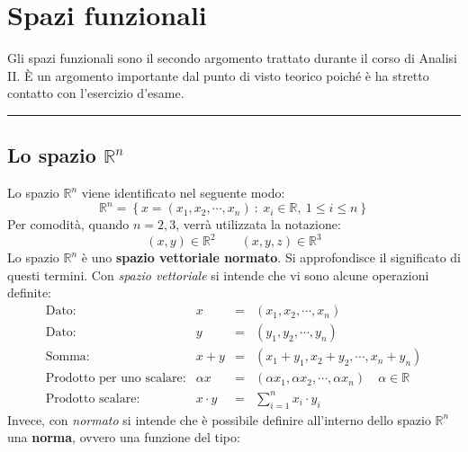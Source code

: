 \documentclass[a4paper]{article}
\newcommand{\longline}{\noindent\rule{\textwidth}{0.4pt}}
\begin{document}
	\section{Spazi funzionali}\label{section: spazi funzionali}

	Gli spazi funzionali sono il secondo argomento trattato durante il corso di Analisi II. È un argomento importante dal punto di visto teorico poiché è ha stretto contatto con l'esercizio d'esame.

	\longline

	\subsection{Lo spazio $\mathbb{R}^{n}$}\label{subsection: lo spazio R^n}

	Lo spazio $\mathbb{R}^{n}$ viene identificato nel seguente modo:
	\begin{equation*}
		\mathbb{R}^{n} = \left\{x = \left(x_{1}, x_{2}, \cdots, x_{n}\right) \: : \: x_{i} \in \mathbb{R}, \: 1 \le i \le n\right\}
	\end{equation*}
	Per comodità, quando $n = 2, 3$, verrà utilizzata la notazione:
	\begin{equation*}
		\left(x,y\right) \in \mathbb{R}^{2} \hspace{2em}
		\left(x,y,z\right) \in \mathbb{R}^{3}
	\end{equation*}
	Lo spazio $\mathbb{R}^{n}$ è uno \textbf{spazio vettoriale normato}. Si approfondisce il significato di questi termini. Con \emph{spazio vettoriale} si intende che vi sono alcune operazioni definite:
	\begin{equation*}
		\begin{array}{rrcl}
			\text{Dato:} & x &=& \left(x_{1}, x_{2}, \cdots, x_{n}\right) \\ [.3em]
			\text{Dato:} & y &=& \left(y_{1}, y_{2}, \cdots, y_{n}\right) \\ [.3em]
			\text{Somma:} & x+y & = & \left(x_{1}+y_{1}, x_{2}+y_{2}, \cdots, x_{n}+y_{n}\right) \\ [.3em]
			\text{Prodotto per uno scalare:} & \alpha x &=& \left(\alpha x_{1}, \alpha x_{2}, \cdots, \alpha x_{n}\right) \hspace{1em} \alpha \in \mathbb{R} \\ [.3em]
			\text{Prodotto scalare:} & x \cdot y &=& \displaystyle\sum_{i=1}^{n} x_{i} \cdot y_{i}
		\end{array}
	\end{equation*}
	Invece, con \emph{normato} si intende che è possibile definire all'interno dello spazio $\mathbb{R}^{n}$ una \textbf{norma}, ovvero una funzione del tipo:
\end{document}
